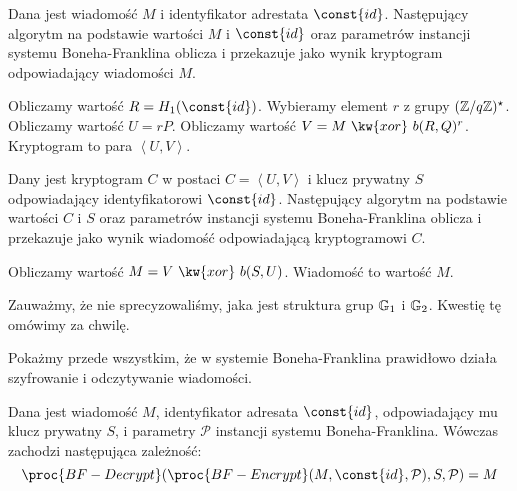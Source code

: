 \begin{algorithm}
Dana jest wiadomość $M$ i identyfikator adrestata $\const{id}$.
Następujący algorytm na podstawie wartości $M$ i $\const{id}$
oraz parametrów instancji systemu Boneha-Franklina
oblicza i przekazuje jako wynik
kryptogram odpowiadający wiadomości $M$.

\begin{codebox}
\li
Obliczamy wartość $R = H_1(\const{id})$.
\li
Wybieramy element $r$ z grupy $(\mathbb{Z} / q\mathbb{Z})^\star$.
\li
Obliczamy wartość $U = rP$.
\li
Obliczamy wartość $V = M\ \kw{xor}\ b(R, Q)^r$.
\li
Kryptogram to para
$\left\langle U, V \right\rangle$.
\end{codebox}
\end{algorithm}

\begin{algorithm}
Dany jest kryptogram $C$ w postaci $C = \left\langle U, V \right\rangle$
i klucz prywatny $S$ odpowiadający identyfikatorowi $\const{id}$.
Następujący algorytm
na podstawie wartości $C$ i $S$
oraz parametrów instancji systemu Boneha-Franklina
oblicza i przekazuje jako wynik
wiadomość odpowiadającą kryptogramowi $C$.

\begin{codebox}
\li
Obliczamy wartość $M = V\ \kw{xor}\ b(S, U)$.
\li
Wiadomość to wartość $M$.
\end{codebox}
\end{algorithm}

\begin{remark}
Zauważmy, że nie sprecyzowaliśmy, jaka jest struktura grup $\mathbb{G}_1$ i $\mathbb{G}_2$.
Kwestię tę omówimy za chwilę.
\end{remark}

\noindent
Pokażmy przede wszystkim, że w systemie Boneha-Franklina
prawidłowo działa szyfrowanie i odczytywanie wiadomości.

\begin{theorem}
Dana jest wiadomość $M$,
identyfikator adresata $\const{id}$,
odpowiadający mu klucz prywatny $S$,
i parametry $\mathcal{P}$ instancji systemu Boneha-Franklina.
Wówczas zachodzi następująca zależność:
\begin{equation*}
\proc{BF-Decrypt}(
    \proc{BF-Encrypt}(
        M,
        \const{id},
        \mathcal{P}
    ),
    S,
    \mathcal{P}
) = M
\end{equation*}
\end{theorem}

